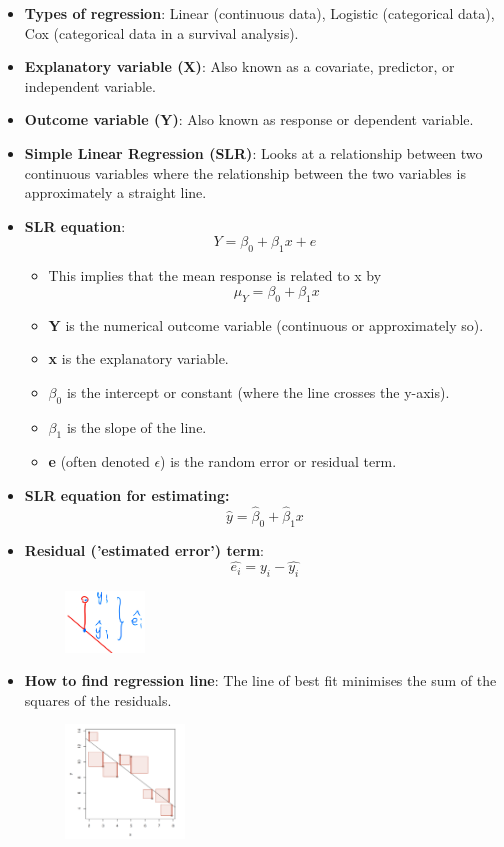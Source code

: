 \documentclass[12pt]{book}
\begin{document}
\begin{itemize}
\item \textbf{Types of regression}: Linear (continuous data), Logistic (categorical data), Cox (categorical data in a survival analysis).
\item \textbf{Explanatory variable (X)}: Also known as a covariate, predictor, or independent variable.
\item \textbf{Outcome variable (Y)}: Also known as response or dependent variable.
\item \textbf{Simple Linear Regression (SLR)}: Looks at a relationship between two continuous variables where the relationship between the two variables is approximately a straight line.
\item \textbf{SLR equation}: $$Y = \beta_0 + \beta_1x + e$$
\begin{itemize}
\item This implies that the mean response is related to x by $$\mu_Y = \beta_0 + \beta_1x$$
\item \textbf{Y} is the numerical outcome variable (continuous or approximately so).
\item \textbf{x} is the explanatory variable.
\item \textbf{$\beta_0$} is the intercept or constant (where the line crosses the y-axis).
\item \textbf{$\beta_1$} is the slope of the line.
\item \textbf{e} (often denoted $\epsilon$) is the random error or residual term.
\end{itemize}
\item \textbf{SLR equation for estimating:}
$$\hat{y}=\hat{\beta}_0+\hat{\beta}_1x$$
\item \textbf{Residual ('estimated error') term}: $$\hat{e_i} = y_i - \hat{y_i}$$
\begin{figure}[H]
    \centering
    \includegraphics[width=0.2\textwidth]{92.png}
\end{figure}
\item \textbf{How to find regression line}: The line of best fit minimises the sum of the squares of the residuals.
\begin{figure}[H]
    \centering
    \includegraphics[width=0.3\textwidth]{1.png}

\end{figure}
\end{itemize}
\end{document}
